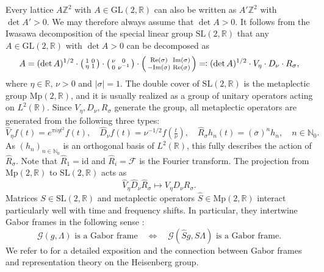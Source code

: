 \documentclass[reqno,a4paper,12pt]{amsart}
\numberwithin{equation}{section}
\newcommand{\N}{\mathbb N}
\newcommand{\Z}{\mathbb Z}
\newcommand{\R}{\mathbb R}
\newcommand{\calG}{\mathcal G}
\begin{document}
Every lattice $A\Z^2$ with $A\in\mathrm{GL}(2,\R)$ can also be written as $A'\Z^2$ with $\det A'>0$. We may therefore always assume that $\det A>0$. It follows from the Iwasawa decomposition \cite[Chap.~VI.~4.]{Knapp1996} of the special linear group $\mathrm{SL}(2,\R)$ that any $A\in\mathrm{GL}(2,\R)$ with $\det A>0$ can be decomposed as
\begin{equation}\label{eq:A_decomposed}
A  = (\det A)^{1/2} \cdot \begin{psmallmatrix}
      1 & 0 \\ \eta & 1
  \end{psmallmatrix} \cdot \begin{psmallmatrix}
      \nu & 0 \\ 0 & \nu^{-1}
  \end{psmallmatrix}  \cdot \begin{psmallmatrix}
      \mathrm{Re}(\sigma) & \mathrm{Im}(\sigma) \\ -\mathrm{Im}(\sigma) & \mathrm{Re}(\sigma) 
       \end{psmallmatrix} 
       \eqqcolon (\det A)^{1/2} \cdot V_\eta \cdot D_\nu \cdot R_{\sigma},
\end{equation}
where $\eta\in\R, \, \nu>0$ and $|\sigma|=1$.
The double cover of $\mathrm{SL}(2,\R)$ is the metaplectic group $\mathrm{Mp}(2,\R)$, and it is usually realized as a group of unitary operators acting on $L^2(\R)$. Since $V_\eta, D_\nu, R_\sigma$ generate the group, all metaplectic operators are generated from the following three types:
\begin{equation}
    \widehat{V}_\eta f(t) = e^{\pi i \eta t^2}f(t),\quad \widehat{D}_\nu f(t) = \nu^{-1/2} f(\tfrac{t}{\nu}),\quad \widehat{R}_\sigma h_n(t) = (\overline{\sigma})^n h_n, \quad n\in\N_0.
\end{equation}
As $(h_n)_{n\in\N_0}$ is an orthogonal basis of $L^2(\R)$, this fully describes the action of $\widehat{R}_{\sigma}$. 
Note that $\widehat{R}_{1}=\mathrm{id}$ and $\widehat{R}_{i}=\mathcal{F}$ is the Fourier transform.
The projection from $\mathrm{Mp}(2,\R)$ to $\mathrm{SL}(2,\R)$
acts as
\begin{equation}\label{eq:pi_Mp}
\widehat{V}_\eta\widehat{D}_\nu\widehat{R}_\sigma \mapsto V_\eta D_\nu R_\sigma.
\end{equation}
Matrices $S\in \mathrm{SL}(2,\R)$ and metaplectic operators $\widehat{S}\in\mathrm{Mp}(2,\R)$ interact particularly well with time and frequency shifts. 
In particular, they intertwine Gabor frames in the following sense \cite[p.~200]{Groechenig2001}:
\begin{equation}\label{eq:Gabor_Mp_invariance}
    \calG(g,\Lambda) \text{ is a Gabor frame}\quad \iff \quad \calG(\widehat{S}g,S\Lambda) \text{ is a Gabor frame.}
\end{equation}
We refer to \cite{Groechenig2001,Folland1989} for a detailed exposition and the connection between Gabor frames and representation theory on the Heisenberg group. 
\end{document}

